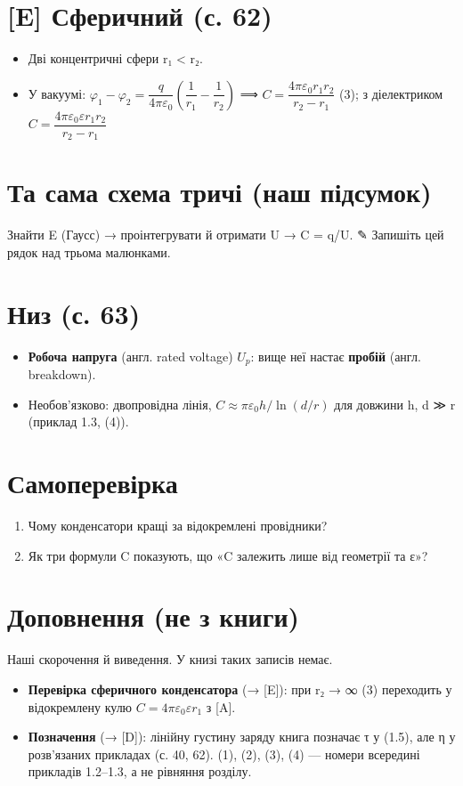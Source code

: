 \documentclass[11pt,a4paper,oneside]{book}
\newcommand{\pen}{{\sffamily\color{accent}✎}}
\begin{document}
\section*{[E] Сферичний (с. 62)}
\begin{itemize}
\item Дві концентричні сфери r₁ < r₂.
\item У вакуумі: $\varphi_1-\varphi_2 = \dfrac{q}{4\pi\varepsilon_0}\left(\dfrac1{r_1}-\dfrac1{r_2}\right)$ ⟹ $C = \dfrac{4\pi\varepsilon_0r_1r_2}{r_2-r_1}$ (3); з діелектриком $C = \dfrac{4\pi\varepsilon_0\varepsilon r_1r_2}{r_2-r_1}$
\end{itemize}

\section*{Та сама схема тричі (наш підсумок)}
Знайти E (Гаусс) → проінтегрувати й отримати U → C = q/U. \pen{} Запишіть цей рядок над трьома малюнками.

\section*{Низ (с. 63)}
\begin{itemize}
\item \textbf{Робоча напруга} (англ. rated voltage) $U_{p}$: вище неї настає \textbf{пробій} (англ. breakdown).
\item Необов'язково: двопровідна лінія, $C \approx \pi\varepsilon_0h/\ln(d/r)$ для довжини h, d ≫ r (приклад 1.3, (4)).
\end{itemize}

\section*{Самоперевірка}
\begin{enumerate}
\item Чому конденсатори кращі за відокремлені провідники?
\item Як три формули C показують, що «C залежить лише від геометрії та ε»?
\end{enumerate}

\section*{Доповнення (не з книги)}
Наші скорочення й виведення. У книзі таких записів немає.
\begin{itemize}
\item \textbf{Перевірка сферичного конденсатора} (→ [E]): при r₂ → ∞ (3) переходить у відокремлену кулю $C = 4\pi\varepsilon_0\varepsilon r_1$ з [A].
\item \textbf{Позначення} (→ [D]): лінійну густину заряду книга позначає τ у (1.5), але η у розв'язаних прикладах (с. 40, 62). (1), (2), (3), (4) — номери всередині прикладів 1.2–1.3, а не рівняння розділу.
\end{itemize}
\end{document}
